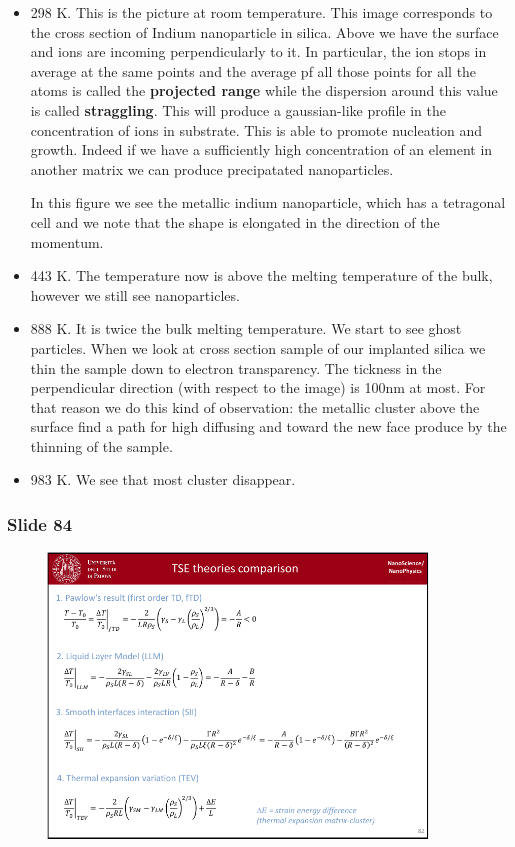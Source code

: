 \documentclass[../main/main.tex]{subfiles}
\begin{document}
\begin{itemize}
\item 298 K. This is the picture at room temperature. This image corresponds to the cross section of Indium nanoparticle in silica. Above we have the surface and ions are incoming perpendicularly to it. In particular, the ion stops in average at the same points and the average pf all those points for all the atoms is called the \textbf{projected range} while the dispersion around this value is called \textbf{straggling}. This will produce a gaussian-like profile in the concentration of ions in substrate. This is able to promote nucleation and growth. Indeed if we have a sufficiently high concentration of an element in another matrix we can produce precipatated nanoparticles.

In this figure we see the metallic indium nanoparticle, which has a tetragonal cell and we note that the shape is elongated in the direction of the momentum.

\item 443 K. The temperature now is above the melting temperature of the bulk, however we still see nanoparticles.

\item 888 K. It is twice the bulk melting temperature. We start to see ghost particles. When we look at cross section sample of our implanted silica we thin the sample down to electron transparency. The tickness in the perpendicular direction (with respect to the image) is 100nm at most.
For that reason we do this kind of observation: the metallic cluster above the surface find a path for high diffusing and toward the new face produce by the thinning of the sample.

\item 983 K. We see that most cluster disappear.

\end{itemize}

\newpage

\subsubsection{Slide 84}

\begin{figure}[h!]
\centering
\includegraphics[page=3,width=0.9\textwidth]{../lessons/pdf_file/5_lesson.pdf}
\end{figure}
\end{document}
